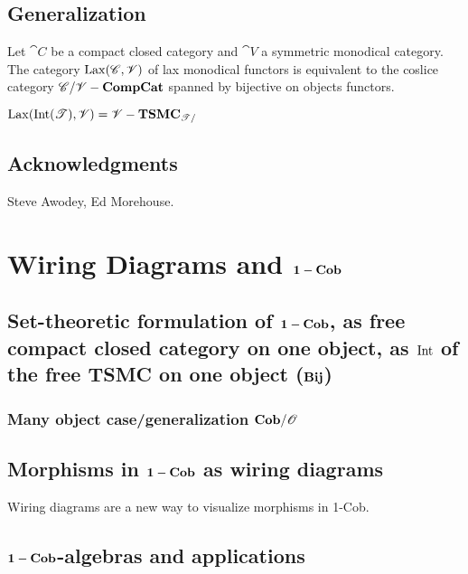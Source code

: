 \section{Generalization}

\begin{theorem}
 Let $\cat{C}$ be a compact closed category and $\cat{V}$ a symmetric monodical category.  The category $\operatorname{Lax}(\mathscr{C},\mathscr{V})$ of lax monodical functors is equivalent to the coslice category $\mathscr{C}/\mathscr{V}-\mathbf{CompCat}$ spanned by bijective on objects functors.
\end{theorem}
\begin{corollary}
 $\operatorname{Lax}(\operatorname{Int}(\mathscr{T}),\mathscr{V})=\mathscr{V}-\mathbf{TSMC}_{\mathscr{T}/}$
\end{corollary}

\section{Acknowledgments}

Steve Awodey, Ed Morehouse.

\chapter{Wiring Diagrams and $\mathbf{1-Cob}$}
\section{Set-theoretic formulation of $\mathbf{1-Cob}$, as free compact closed category on one object, as $\operatorname{Int}$ of the free TSMC on one object ($\mathbf{Bij}$)}
\subsection{Many object case/generalization $\mathbf{Cob}/\mathscr{O}$}

\section{Morphisms in $\mathbf{1-Cob}$ as wiring diagrams}

Wiring diagrams are a new way to visualize morphisms in 1-Cob.


\section{$\mathbf{1-Cob}$-algebras and applications}

